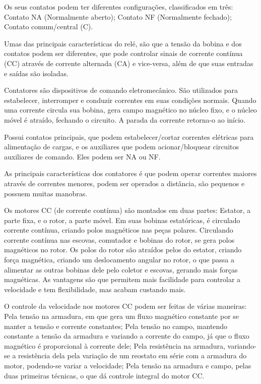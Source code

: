 \documentclass{article}
\begin{document}
Os seus contatos podem ter diferentes configurações, classificados em três: Contato NA (Normalmente aberto); Contato NF (Normalmente fechado); Contato comum/central (C). 

Umas das principais características do relé, são que a tensão da bobina e dos contatos podem ser diferentes, que pode controlar sinais de corrente contínua (CC) através de corrente alternada (CA) e vice-versa, além de que suas entradas e saídas são isoladas. 

Contatores são dispositivos de comando eletromecânico. São utilizados para estabelecer, interromper e conduzir correntes em suas condições normais. Quando uma corrente circula sua bobina, gera campo magnético no núcleo fixo, e o núcleo móvel é atraído, fechando o circuito. A parada da corrente retorna-o ao início. 

Possui contatos principais, que podem estabelecer/cortar correntes elétricas para alimentação de cargas, e os auxiliares que podem acionar/bloquear circuitos auxiliares de comando. Eles podem ser NA ou NF. 

As principais características dos contatores é que podem operar correntes maiores através de correntes menores, podem ser operados a distância, são pequenos e possuem muitas manobras. 

 

Os motores CC (de corrente contínua) são montados em duas partes: Estator, a parte fixa, e o rotor, a parte móvel. Em suas bobinas estatóricas, é circulado corrente contínua, criando polos magnéticos nas peças polares. Circulando corrente contínua nas escovas, comutador e bobinas do rotor, se gera polos magnéticos no rotor. Os polos do rotor são atraídos pelos do estator, criando força magnética, criando um deslocamento angular no rotor, o que passa a alimentar as outras bobinas dele pelo coletor e escovas, gerando mais forças magnéticas. As vantagens são que permitem mais facilidade para controlar a velocidade e tem flexibilidade, mas acabam custando mais. 

O controle da velocidade nos motores CC podem ser feitas de várias maneiras: Pela tensão na armadura, em que gera um fluxo magnético constante por se manter a tensão e corrente constantes; Pela tensão no campo, mantendo constante a tensão da armadura e variando a corrente do campo, já que o fluxo magnético é proporcional à corrente dele; Pela resistência na armadura, variando-se a resistência dela pela variação de um reostato em série com a armadura do motor, podendo-se variar a velocidade; Pela tensão na armadura e campo, pelas duas primeiras técnicas, o que dá controle integral do motor CC.  
\end{document}
